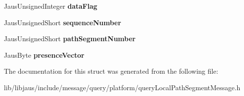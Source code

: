 \begin{DoxyCompactItemize}
\item 
\hypertarget{struct_query_local_path_segment_message_struct_aab43807ed0f8df82d61bec5ed5c7c70e}{\-Jaus\-Unsigned\-Integer {\bfseries data\-Flag}}\label{struct_query_local_path_segment_message_struct_aab43807ed0f8df82d61bec5ed5c7c70e}

\item 
\hypertarget{struct_query_local_path_segment_message_struct_a643a9409ac0e7f2fd9c7cca3033a8b33}{\-Jaus\-Unsigned\-Short {\bfseries sequence\-Number}}\label{struct_query_local_path_segment_message_struct_a643a9409ac0e7f2fd9c7cca3033a8b33}

\item 
\hypertarget{struct_query_local_path_segment_message_struct_a7c0c8259a8e95cd4b5fa5e3c19e65c22}{\-Jaus\-Unsigned\-Short {\bfseries path\-Segment\-Number}}\label{struct_query_local_path_segment_message_struct_a7c0c8259a8e95cd4b5fa5e3c19e65c22}

\item 
\hypertarget{struct_query_local_path_segment_message_struct_afa8352a7464b86108d0037a4d6a3c563}{\-Jaus\-Byte {\bfseries presence\-Vector}}\label{struct_query_local_path_segment_message_struct_afa8352a7464b86108d0037a4d6a3c563}

\end{DoxyCompactItemize}


\-The documentation for this struct was generated from the following file\-:\begin{DoxyCompactItemize}
\item 
lib/libjaus/include/message/query/platform/query\-Local\-Path\-Segment\-Message.\-h\end{DoxyCompactItemize}
